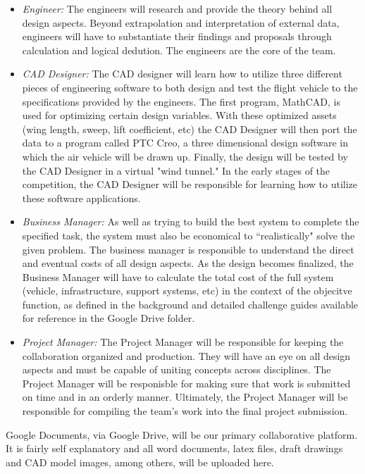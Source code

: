 \documentclass{article}
\begin{document}
\begin{itemize}
\item \emph{Engineer:} The engineers will research and provide the theory behind all design aspects. Beyond extrapolation and interpretation of external data, engineers will have to substantiate their findings and proposals through calculation and logical dedution. The engineers are the core of the team.
\item \emph{CAD Designer:} The CAD designer will learn how to utilize three different pieces of engineering software to both design and test the flight vehicle to the specifications provided by the engineers. The first program, MathCAD, is used for optimizing certain design variables. With these optimized assets (wing length, sweep, lift coefficient, etc) the CAD Designer will then port the data to a program called PTC Creo, a three dimensional design software in which the air vehicle will be drawn up. Finally, the design will be tested by the CAD Designer in a virtual "wind tunnel." In the early stages of the competition, the CAD Designer will be responsible for learning how to utilize these software applications.
\item \emph{Business Manager:} As well as trying to build the best system to complete the specified task, the system must also be economical to ``realistically" solve the given problem. The business manager is responsible to understand the direct and eventual costs of all design aspects. As the design becomes finalized, the Business Manager will have to calculate the total cost of the full system (vehicle, infrastructure, support systems, etc) in the context of the objecitve function, as defined in the background and detailed challenge guides available for reference in the Google Drive folder.
\item \emph{Project Manager:} The Project Manager will be responsible for keeping the collaboration organized and production. They will have an eye on all design aspects and must be capable of uniting concepts across disciplines. The Project Manager will be responisble for making sure that work is submitted on time and in an orderly manner. Ultimately, the Project Manager will be responsible for compiling the team's work into the final project submission.
\end{itemize}



\vspace{1pc}

Google Documents, via Google Drive, will be our primary collaborative platform. It is fairly self explanatory and all word documents, latex files, draft drawings and CAD model images, among others, will be uploaded here.
\end{document}
